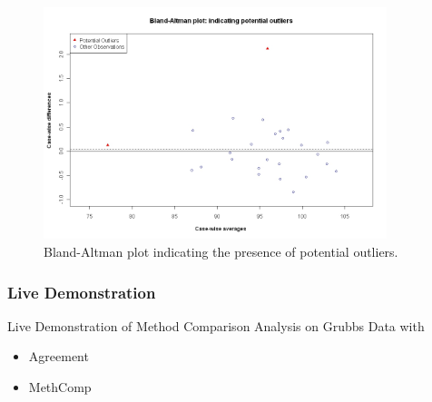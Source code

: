 \documentclass[compress]{beamer}        %
\begin{document}
\begin{frame}
\begin{figure}[h!]
\begin{center}
  \includegraphics[width=100mm]{BAOutliers.jpeg}
  \caption{Bland-Altman plot indicating the presence of potential outliers.}\label{Outliers}
\end{center}
\end{figure}

\end{frame}

\begin{frame}

\frametitle{Live Demonstration}

Live Demonstration of Method Comparison Analysis on Grubbs Data with 
\begin{itemize}
\item Agreement 
\item MethComp 
\end{itemize}

\end{frame}


\end{document}
